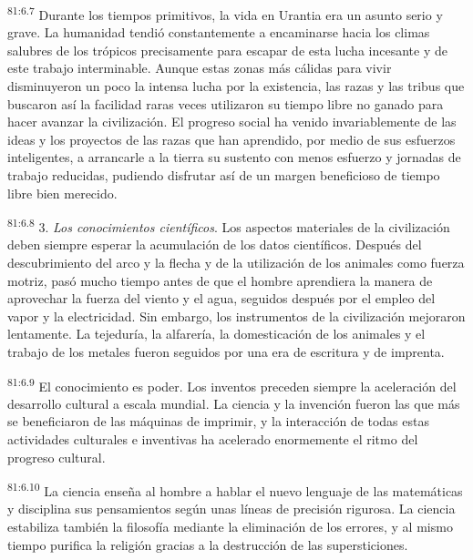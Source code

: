 \par
\textsuperscript{81:6.7} Durante los tiempos primitivos, la vida en Urantia era un asunto serio y grave. La humanidad tendió constantemente a encaminarse hacia los climas salubres de los trópicos precisamente para escapar de esta lucha incesante y de este trabajo interminable. Aunque estas zonas más cálidas para vivir disminuyeron un poco la intensa lucha por la existencia, las razas y las tribus que buscaron así la facilidad raras veces utilizaron su tiempo libre no ganado para hacer avanzar la civilización. El progreso social ha venido invariablemente de las ideas y los proyectos de las razas que han aprendido, por medio de sus esfuerzos inteligentes, a arrancarle a la tierra su sustento con menos esfuerzo y jornadas de trabajo reducidas, pudiendo disfrutar así de un margen beneficioso de tiempo libre bien merecido.

\par
\textsuperscript{81:6.8} 3. \textit{Los conocimientos científicos}. Los aspectos materiales de la civilización deben siempre esperar la acumulación de los datos científicos. Después del descubrimiento del arco y la flecha y de la utilización de los animales como fuerza motriz, pasó mucho tiempo antes de que el hombre aprendiera la manera de aprovechar la fuerza del viento y el agua, seguidos después por el empleo del vapor y la electricidad. Sin embargo, los instrumentos de la civilización mejoraron lentamente. La tejeduría, la alfarería, la domesticación de los animales y el trabajo de los metales fueron seguidos por una era de escritura y de imprenta.

\par
\textsuperscript{81:6.9} El conocimiento es poder. Los inventos preceden siempre la aceleración del desarrollo cultural a escala mundial. La ciencia y la invención fueron las que más se beneficiaron de las máquinas de imprimir, y la interacción de todas estas actividades culturales e inventivas ha acelerado enormemente el ritmo del progreso cultural.

\par
\textsuperscript{81:6.10} La ciencia enseña al hombre a hablar el nuevo lenguaje de las matemáticas y disciplina sus pensamientos según unas líneas de precisión rigurosa. La ciencia estabiliza también la filosofía mediante la eliminación de los errores, y al mismo tiempo purifica la religión gracias a la destrucción de las supersticiones.


